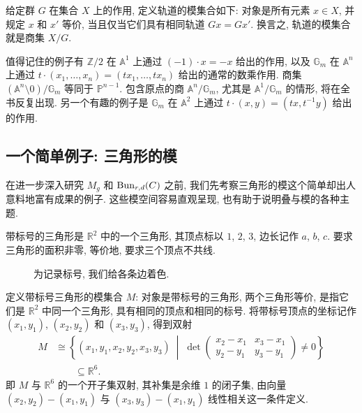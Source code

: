 \begin{example}[轨道的模集合]\label{src:1.2.3}
给定群 $G$ 在集合 $X$ 上的作用, 定义轨道的模集合如下: 对象是所有元素 $x\in X$, 并规定 $x$ 和 $x'$ 等价, 当且仅当它们具有相同轨道 $Gx=Gx'$. 换言之, 轨道的模集合就是商集 $X/G$.
\end{example}
值得记住的例子有 $\mathbb Z/2$ 在 $\mathbb A^1$ 上通过 $(-1)\cdot x=-x$ 给出的作用, 以及 $\mathbb G_m$ 在 $\mathbb A^n$ 上通过 $t\cdot(x_1,\ldots,x_n)=(tx_1,\ldots,tx_n)$ 给出的通常的数乘作用. 商集 $(\mathbb A^n\setminus0)/\mathbb G_m$ 等同于 $\mathbb P^{n-1}$. 包含原点的商 $\mathbb A^n/\mathbb G_m$, 尤其是 $\mathbb A^1/\mathbb G_m$ 的情形, 将在全书反复出现. 另一个有趣的例子是 $\mathbb G_m$ 在 $\mathbb A^2$ 上通过 $t\cdot(x,y)=(tx,t^{-1}y)$ 给出的作用.

\subsection{一个简单例子: 三角形的模}\label{src:1.2.1-subsection}
在进一步深入研究 $M_g$ 和 $\operatorname{Bun}_{r,d}(C)$ 之前, 我们先考察三角形的模这个简单却出人意料地富有成果的例子. 这些模空间容易直观呈现, 也有助于说明叠与模的各种主题.

\begin{example}[带标号的三角形]\label{src:1.2.4}
带标号的三角形是 $\mathbb R^2$ 中的一个三角形, 其顶点标以 $1$, $2$, $3$, 边长记作 $a$, $b$, $c$. 要求三角形的面积非零, 等价地, 要求三个顶点不共线.
\end{example}
\begin{figure}[htbp]
\centering
{}
\caption{为记录标号, 我们给各条边着色.}\label{src:1.2.5}
\end{figure}
定义带标号三角形的模集合 $M$: 对象是带标号的三角形, 两个三角形等价, 是指它们是 $\mathbb R^2$ 中同一个三角形, 具有相同的顶点和相同的标号. 将带标号顶点的坐标记作 $(x_1,y_1)$, $(x_2,y_2)$ 和 $(x_3,y_3)$, 得到双射
\begin{equation}\label{src:1.2.6}
\begin{aligned}
M&\cong\left\{(x_1,y_1,x_2,y_2,x_3,y_3)\;\middle|\;
\det\begin{pmatrix}x_2-x_1&x_3-x_1\\y_2-y_1&y_3-y_1\end{pmatrix}\neq0\right\}\\
&\hspace{2em}\subseteq\mathbb R^6.
\end{aligned}
\end{equation}
即 $M$ 与 $\mathbb R^6$ 的一个开子集双射, 其补集是余维 $1$ 的闭子集, 由向量 $(x_2,y_2)-(x_1,y_1)$ 与 $(x_3,y_3)-(x_1,y_1)$ 线性相关这一条件定义.

